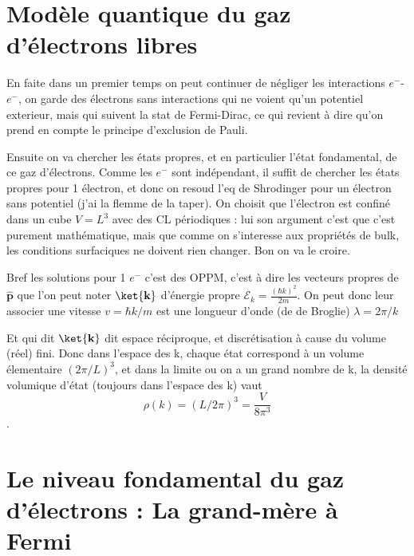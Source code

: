 \documentclass[a4paper]{report}
\begin{document}
 \section{Modèle quantique du gaz d'électrons libres}
 En faite dans un premier temps on peut continuer de négliger les interactions $e^-$- $e^-$, on garde des électrons sans interactions qui ne voient qu'un potentiel exterieur, mais qui suivent la stat de Fermi-Dirac, ce qui revient à dire qu'on prend en compte le principe d'exclusion de Pauli.
 
 Ensuite on va chercher les états propres, et en particulier l'état fondamental, de ce gaz d'électrons. Comme les $e^-$ sont indépendant, il suffit de chercher les états propres pour 1 électron, et donc on resoud l'eq de Shrodinger pour un électron sans potentiel (j'ai la flemme de la taper). On choisit que l'électron est confiné dans un cube $V=L^3$ avec des CL périodiques : lui son argument c'est que c'est purement mathématique, mais que comme on s'interesse aux propriétés de bulk, les conditions surfaciques ne doivent rien changer. Bon on va le croire.
 
 Bref les solutions pour 1 $e^-$ c'est des OPPM, c'est à dire les vecteurs propres de $\mathbf{\hat p}$ que l'on peut noter $\ket{\mathbf{k}}$ d'énergie propre $\mathcal{E}_k=\frac{(\hbar k)^2}{2m}$. On peut donc leur associer une vitesse $v=\hbar k /m$ est une longueur d'onde (de de Broglie) $\lambda = 2\pi /k$
 
 Et qui dit $\ket{\mathbf{k}}$ dit espace réciproque, et discrétisation à cause du volume (réel) fini. Donc dans l'espace des k, chaque état correspond à un volume élementaire $(2\pi/L)^3$, et dans la limite ou on a un grand nombre de k, la densité volumique d'état (toujours dans l'espace des k) vaut $$ \rho(k)= (L/2\pi)^3 = \frac{V}{8 \pi ^3} $$.
 
 \section{Le niveau fondamental du gaz d'électrons : La grand-mère à Fermi}
 
\end{document}
